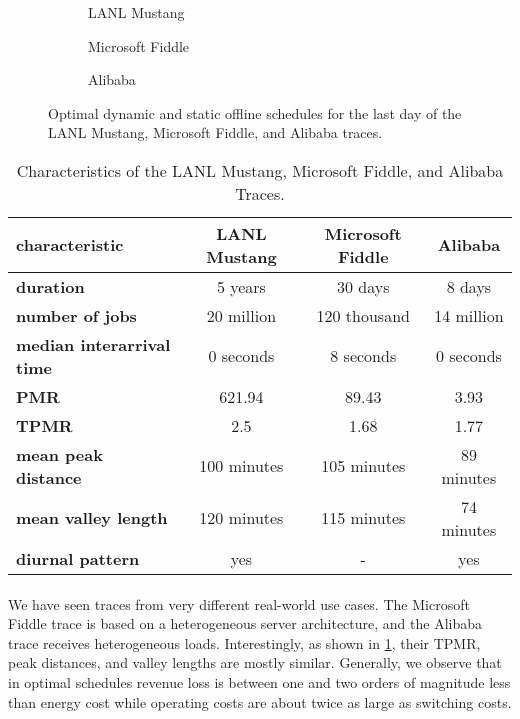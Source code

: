 \begin{figure}
    \begin{subfigure}[b]{.345\linewidth}
    \resizebox{\textwidth}{!}{}
    \caption{LANL Mustang}\label{fig:los_alamos:schedule}
    \end{subfigure}
    \begin{subfigure}[b]{.305\linewidth}
    \resizebox{\textwidth}{!}{}
    \caption{Microsoft Fiddle}\label{fig:microsoft:schedule}
    \end{subfigure}
    \begin{subfigure}[b]{.335\linewidth}
    \resizebox{\textwidth}{!}{}
    \caption{Alibaba}\label{fig:alibaba:schedule}
    \end{subfigure}
    \caption{Optimal dynamic and static offline schedules for the last day of the LANL Mustang, Microsoft Fiddle, and Alibaba traces.}
\end{figure}

\begin{table}
    \centering
    \begin{tabular}{>{\bfseries\centering}l|c|c|c}
        characteristic & LANL Mustang & Microsoft Fiddle & Alibaba \\\hline
        duration & 5 years & 30 days & 8 days \\
        number of jobs & 20 million & 120 thousand & 14 million \\
        median interarrival time & 0 seconds & 8 seconds & 0 seconds \\
        PMR & 621.94 & 89.43 & 3.93 \\
        TPMR & 2.5 & 1.68 & 1.77 \\
        mean peak distance & 100 minutes & 105 minutes & 89 minutes \\
        mean valley length & 120 minutes & 115 minutes & 74 minutes \\
        diurnal pattern & yes & - & yes \\
    \end{tabular}
    \caption{Characteristics of the LANL Mustang, Microsoft Fiddle, and Alibaba Traces.}
    \label{tab:traces}
\end{table}

\paragraph{} We have seen traces from very different real-world use cases. The Microsoft Fiddle trace is based on a heterogeneous server architecture, and the Alibaba trace receives heterogeneous loads. Interestingly, as shown in \cref{tab:traces}, their TPMR, peak distances, and valley lengths are mostly similar. Generally, we observe that in optimal schedules revenue loss is between one and two orders of magnitude less than energy cost while operating costs are about twice as large as switching costs.

